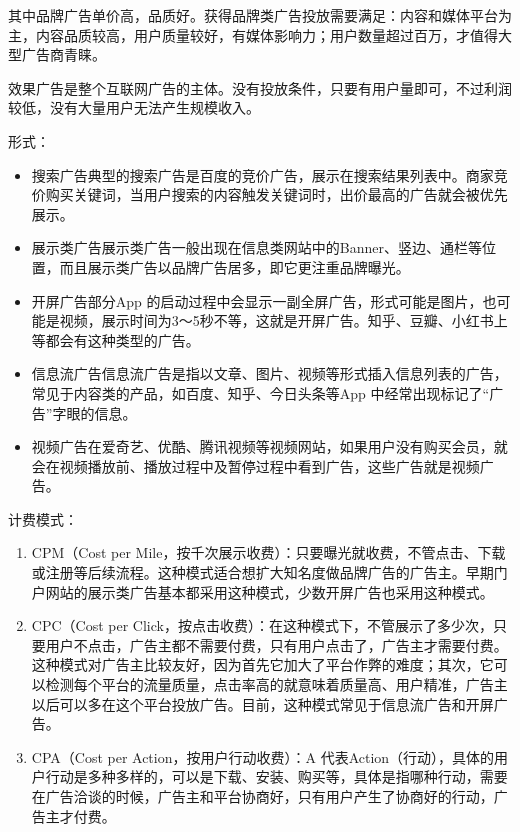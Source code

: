 \documentclass[letterpaper,10pt,english]{sphinxmanual}
\begin{document}
其中品牌广告单价高，品质好。获得品牌类广告投放需要满足：内容和媒体平台为主，内容品质较高，用户质量较好，有媒体影响力；用户数量超过百万，才值得大型广告商青睐。

效果广告是整个互联网广告的主体。没有投放条件，只要有用户量即可，不过利润较低，没有大量用户无法产生规模收入。%
\begin{footnote}[146]\sphinxAtStartFootnote
{}
%
\end{footnote}

形式：
\begin{itemize}
\item {} 
搜索广告典型的搜索广告是百度的竞价广告，展示在搜索结果列表中。商家竞价购买关键词，当用户搜索的内容触发关键词时，出价最高的广告就会被优先展示。

\item {} 
展示类广告展示类广告一般出现在信息类网站中的Banner、竖边、通栏等位置，而且展示类广告以品牌广告居多，即它更注重品牌曝光。

\item {} 
开屏广告部分App
的启动过程中会显示一副全屏广告，形式可能是图片，也可能是视频，展示时间为3～5秒不等，这就是开屏广告。知乎、豆瓣、小红书上等都会有这种类型的广告。

\item {} 
信息流广告信息流广告是指以文章、图片、视频等形式插入信息列表的广告，常见于内容类的产品，如百度、知乎、今日头条等App
中经常出现标记了“广告”字眼的信息。

\item {} 
视频广告在爱奇艺、优酷、腾讯视频等视频网站，如果用户没有购买会员，就会在视频播放前、播放过程中及暂停过程中看到广告，这些广告就是视频广告。

\end{itemize}

计费模式：
\begin{enumerate}
%
\item {} 
CPM（Cost per
Mile，按千次展示收费）：只要曝光就收费，不管点击、下载或注册等后续流程。这种模式适合想扩大知名度做品牌广告的广告主。早期门户网站的展示类广告基本都采用这种模式，少数开屏广告也采用这种模式。

\item {} 
CPC（Cost per
Click，按点击收费）：在这种模式下，不管展示了多少次，只要用户不点击，广告主都不需要付费，只有用户点击了，广告主才需要付费。这种模式对广告主比较友好，因为首先它加大了平台作弊的难度；其次，它可以检测每个平台的流量质量，点击率高的就意味着质量高、用户精准，广告主以后可以多在这个平台投放广告。目前，这种模式常见于信息流广告和开屏广告。

\item {} 
CPA（Cost per Action，按用户行动收费）：A
代表Action（行动），具体的用户行动是多种多样的，可以是下载、安装、购买等，具体是指哪种行动，需要在广告洽谈的时候，广告主和平台协商好，只有用户产生了协商好的行动，广告主才付费。

\end{enumerate}
\end{document}
